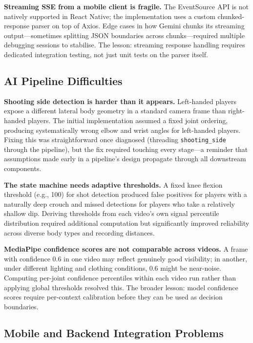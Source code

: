 \textbf{Streaming SSE from a mobile client is fragile.}
The EventSource API is not natively supported in React Native; the implementation uses a custom chunked-response parser on top of Axios. Edge cases in how Gemini chunks its streaming output---sometimes splitting JSON boundaries across chunks---required multiple debugging sessions to stabilise. The lesson: streaming response handling requires dedicated integration testing, not just unit tests on the parser itself.

\subsection{AI Pipeline Difficulties}

\textbf{Shooting side detection is harder than it appears.}
Left-handed players expose a different lateral body geometry in a standard camera frame than right-handed players. The initial implementation assumed a fixed joint ordering, producing systematically wrong elbow and wrist angles for left-handed players. Fixing this was straightforward once diagnosed (threading \lstinline|shooting_side| through the pipeline), but the fix required touching every stage---a reminder that assumptions made early in a pipeline's design propagate through all downstream components.

\textbf{The state machine needs adaptive thresholds.}
A fixed knee flexion threshold (e.g., 100\textdegree) for shot detection produced false positives for players with a naturally deep crouch and missed detections for players who take a relatively shallow dip. Deriving thresholds from each video's own signal percentile distribution required additional computation but significantly improved reliability across diverse body types and recording distances.

\textbf{MediaPipe confidence scores are not comparable across videos.}
A frame with confidence 0.6 in one video may reflect genuinely good visibility; in another, under different lighting and clothing conditions, 0.6 might be near-noise. Computing per-joint confidence percentiles within each video run rather than applying global thresholds resolved this. The broader lesson: model confidence scores require per-context calibration before they can be used as decision boundaries.

\subsection{Mobile and Backend Integration Problems}

